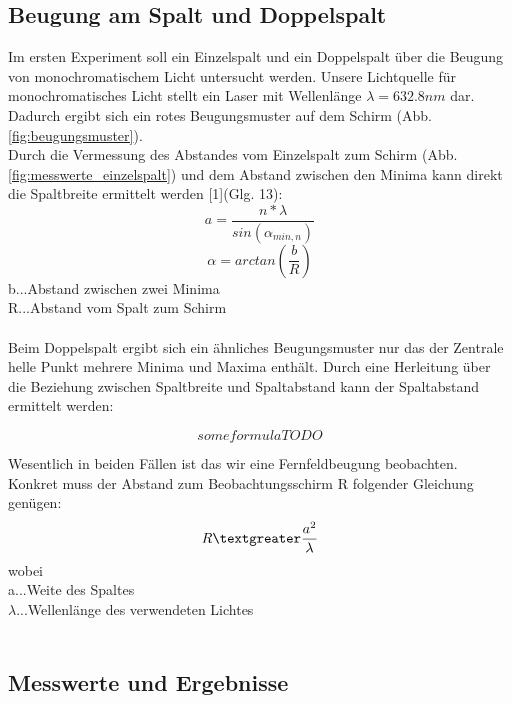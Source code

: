 \documentclass[12pt,a4paper]{article}
\begin{document}
\begin{multicols}{2}

\section{Beugung am Spalt und Doppelspalt}
Im ersten Experiment soll ein Einzelspalt und ein Doppelspalt über die Beugung von monochromatischem Licht untersucht werden. Unsere Lichtquelle für monochromatisches Licht stellt ein Laser mit Wellenlänge $\lambda = 632.8nm$ dar. Dadurch ergibt sich ein rotes Beugungsmuster auf dem Schirm (Abb. \ref{fig:beugungsmuster}). 
\\
Durch die Vermessung des Abstandes vom Einzelspalt zum Schirm (Abb. \ref{fig:messwerte_einzelspalt}) und dem Abstand zwischen den Minima kann direkt die Spaltbreite ermittelt werden [1](Glg. 13):
$$a = \frac{n*\lambda}{sin(\alpha_{min,n})} $$
$$\alpha = arctan(\frac{b}{R})$$
b...Abstand zwischen zwei Minima\\
R...Abstand vom Spalt zum Schirm\\
\\
Beim Doppelspalt ergibt sich ein ähnliches Beugungsmuster nur das der Zentrale helle Punkt mehrere Minima und Maxima enthält. Durch eine Herleitung über die Beziehung zwischen Spaltbreite und Spaltabstand kann der Spaltabstand ermittelt werden:


$$ some formula TODO $$



Wesentlich in beiden Fällen ist das wir eine Fernfeldbeugung beobachten. Konkret muss der Abstand zum Beobachtungsschirm R folgender Gleichung genügen:
$$R \textgreater \frac{a^2}{\lambda}$$
wobei\\
a...Weite des Spaltes\\
$\lambda$...Wellenlänge des verwendeten Lichtes\\
\\


\subsection{Messwerte und Ergebnisse}


\end{multicols}
\end{document}
